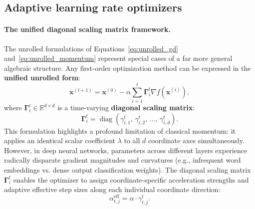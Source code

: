\subsection{Adaptive learning rate optimizers}
\label{sec:unified_diagonal_scaling}

\paragraph{The unified diagonal scaling matrix framework.}
The unrolled formulations of Equations~\eqref{eq:unrolled_gd} and~\eqref{eq:unrolled_momentum} represent special cases of a far more general algebraic structure. Any first-order optimization method can be expressed in the \textbf{unified unrolled form}:
\begin{equation}
\mathbf{x}^{(t+1)} = \mathbf{x}^{(0)} - \alpha \sum_{i=1}^t \boldsymbol{\Gamma}_i^t \nabla f(\mathbf{x}^{(i)}),
\label{eq:unified_scaling_matrix}
\end{equation}
where $\boldsymbol{\Gamma}_i^t \in \mathbb{R}^{d \times d}$ is a time-varying \textbf{diagonal scaling matrix}:
\begin{equation}
\boldsymbol{\Gamma}_i^t = \operatorname{diag}\left( \gamma_{i, 1}^t, \, \gamma_{i, 2}^t, \, \dots, \, \gamma_{i, d}^t \right).
\end{equation}
This formulation highlights a profound limitation of classical momentum: it applies an identical scalar coefficient $\lambda$ to all $d$ coordinate axes simultaneously. However, in deep neural networks, parameters across different layers experience radically disparate gradient magnitudes and curvatures (e.g., infrequent word embeddings vs. dense output classification weights). The diagonal scaling matrix $\boldsymbol{\Gamma}_i^t$ enables the optimizer to assign coordinate-specific acceleration strengths and adaptive effective step sizes along each individual coordinate direction:
\begin{equation}
\alpha_{t, j}^{\text{eff}} = \alpha \cdot \gamma_{t, j}^t.
\end{equation}


